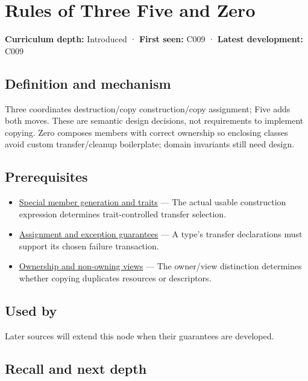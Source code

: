 \hypertarget{appendix-7679107d057e}{}\label{referencestart:appendix-7679107d057e}
\section{Rules of Three Five and Zero}\label{appendix-7679107d057e-rules-of-three-five-and-zero}

\textbf{Curriculum depth:} Introduced · \textbf{First seen:} C009 · \textbf{Latest development:} C009

\subsection{Definition and mechanism}\label{appendix-7679107d057e-definition-and-mechanism}

Three coordinates destruction/copy construction/copy assignment; Five adds both moves. These are semantic design decisions, not requirements to implement copying. Zero composes members with correct ownership so enclosing classes avoid custom transfer/cleanup boilerplate; domain invariants still need design.

\subsection{Prerequisites}\label{appendix-7679107d057e-prerequisites}

\begin{itemize}
\tightlist
\item
  \hyperref[appendix-42e02a12c694]{Special member generation and traits} --- The actual usable construction expression determines trait-controlled transfer selection.
\item
  \hyperref[appendix-bea6beb5350f]{Assignment and exception guarantees} --- A type's transfer declarations must support its chosen failure transaction.
\item
  \hyperref[appendix-d52e4486f527]{Ownership and non-owning views} --- The owner/view distinction determines whether copying duplicates resources or descriptors.
\end{itemize}

\subsection{Used by}\label{appendix-7679107d057e-used-by}

Later sources will extend this node when their guarantees are developed.

\subsection{Recall and next depth}\label{appendix-7679107d057e-recall-and-next-depth}

